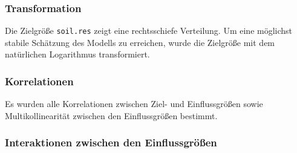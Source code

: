 \subsubsection{Transformation}
Die Zielgröße \texttt{soil.res} zeigt eine rechtsschiefe Verteilung. Um eine möglichst stabile Schätzung des Modells
zu erreichen, wurde die Zielgröße mit dem natürlichen Logarithmus transformiert.

\subsubsection{Korrelationen}

Es wurden alle Korrelationen zwischen Ziel- und Einflussgrößen sowie Multikollinearität
zwischen den Einflussgrößen bestimmt.

\subsubsection{Interaktionen zwischen den Einflussgrößen} \label{Interaktionen}

